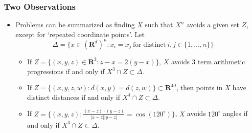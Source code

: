 \documentclass[usenames,dvipsnames]{beamer}
\begin{document}
\begin{frame}
    \frametitle{Two Observations}

    \begin{itemize}
        \item Problems can be summarized as finding $X$ such that $X^n$ avoids a given set $Z$, except for `repeated coordinate points'. Let
        \[ \Delta = \{ x \in (\mathbf{R}^d)^n: x_i = x_j\ \text{for distinct}\ i,j \in \{ 1, \dots, n \} \} \]
        \vspace{-1.5em}


        \begin{itemize}
           \item If $Z = \{ (x,y,z) \in \mathbf{R}^3: z - x = 2(y - x) \}$, $X$ avoids 3 term arithmetic progressions if and only if $X^3 \cap Z \subset \Delta$.

            \item If $Z = \{ (x,y,z,w): d(x,y) = d(z,w) \} \subset \mathbf{R}^{4d}$, then points in $X$ have distinct distances if and only if $X^4 \cap Z \subset \Delta$.

            \item If $Z = \{ (x,y,z): \frac{(x-z) \cdot (y-z)}{|x-z||y-z|} = \cos(120^\circ)\}$, $X$ avoids $120^\circ$ angles if and only if $X^3 \cap Z \subset \Delta$.
        \end{itemize}
    \end{itemize}
\end{frame}
\end{document}
